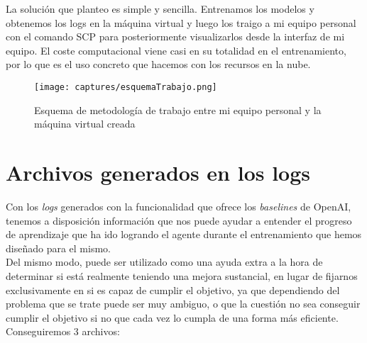 \documentclass[11pt,fleqn]{book} %
\begin{document}
La solución que planteo es simple y sencilla. Entrenamos los modelos y obtenemos los logs en la máquina virtual y luego los traigo a mi equipo personal con el comando SCP para posteriormente visualizarlos desde la interfaz de mi equipo. El coste computacional viene casi en su totalidad en el entrenamiento, por lo que es el uso concreto que hacemos con los recursos en la nube.

\begin{figure}[H]
	\centering\texttt{[image: captures/esquemaTrabajo.png]}
	\caption{Esquema de metodología de trabajo entre mi equipo personal y la máquina virtual creada}
	\label{fig:formaTrabajo} %
\end{figure}

\section{Archivos generados en los logs}\label{sec:logs}

Con los \textit{logs} generados con la funcionalidad que ofrece los \textit{baselines} de OpenAI, tenemos a disposición información que nos puede ayudar a entender el progreso de aprendizaje que ha ido logrando el agente durante el entrenamiento que hemos diseñado para el mismo. \\

Del mismo modo, puede ser utilizado como una ayuda extra a la hora de determinar si está realmente teniendo una mejora sustancial, en lugar de fijarnos exclusivamente en si es capaz de cumplir el objetivo, ya que dependiendo del problema que se trate puede ser muy ambiguo, o que la cuestión no sea conseguir cumplir el objetivo si no que cada vez lo cumpla de una forma más eficiente. \\

Conseguiremos 3 archivos: \\
\end{document}
